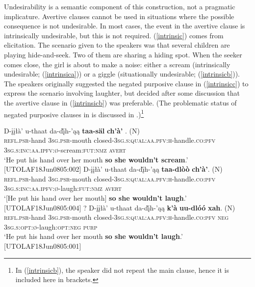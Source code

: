 \documentclass[output=paper,colorlinks,citecolor=brown]{langscibook}
\begin{document}
Undesirability is a semantic component of this construction, not a pragmatic implicature. Avertive clauses cannot be used in situations where the possible consequence is not undesirable. In most cases, the event in the avertive clause is intrinsically undesirable, but this is not required. (\ref{intrinsic}) comes from elicitation. The scenario given to the speakers was that several children are playing hide-and-seek. Two of them are sharing a hiding spot. When the seeker comes close, the girl is about to make a noise: either a scream (intrinsically undesirable; (\ref{intrinsica})) or a giggle (situationally undesirable; (\ref{intrinsicb})). The speakers originally suggested the negated purposive clause in (\ref{intrinsicc}) to express the scenario involving laughter, but decided after some discussion that the avertive clause in (\ref{intrinsicb}) was preferable. (The problematic status of negated purposive clauses in  is discussed in .)\footnote{In (\ref{intrinsicb}), the speaker did not repeat the main clause, hence it is included here in brackets.}

\begin{exe}
\ex \label{intrinsic}
\begin{xlista}
\ex \label{intrinsica}
\gll D-įįłà' u-thaat da-dį̀h-'ąą \textbf{taa-säl} {\textbf{ch'à'} . \textnormal{(N)}} \\
\textsc{refl.psr}-hand \textsc{3sg.psr}-mouth closed-\textsc{3sg.s:qual:aa.pfv:h}-handle.\textsc{co:pfv} \textsc{3sg.s:inc:aa.ipfv:ø}-scream:\textsc{fut:nmz} \textsc{avert} \\
\glt `He put his hand over her mouth \textbf{so she wouldn't scream}.' \\ \hfill [UTOLAF18Jun0805:002]
\ex \label{intrinsicb}
\gll {\ob}D-įįłà' u-thaat da-dį̀h-'ąą{\cb} \textbf{taa-dlòò} {\textbf{ch'à'}. \textnormal{(N)}}\\
\textsc{refl.psr}-hand \textsc{3sg.psr}-mouth closed-\textsc{3sg.s:qual:aa.pfv:h}-handle.\textsc{co:pfv} \textsc{3sg.s:inc:aa.ipfv:ø}-laugh:\textsc{fut:nmz} \textsc{avert} \\
\glt `[He put his hand over her mouth] \textbf{so she wouldn't laugh}.' \\ \hfill [UTOLAF18Jun0805:004]
\ex \label{intrinsicc}
\gll ? D-įįłà' u-thaat da-dį̀h-'ąą \textbf{k'à} \textbf{uu-dlóó} {\textbf{xah}. \textnormal{(N)}}\\
{} \textsc{refl.psr}-hand \textsc{3sg.psr}-mouth closed-\textsc{3sg.s:qual:aa.pfv:h}-handle.\textsc{co:pfv} \textsc{neg} \textsc{3sg.s:opt:ø}-laugh:\textsc{opt:neg} \textsc{purp} \\
\glt `He put his hand over her mouth \textbf{so she wouldn't laugh}.' \\ \hfill [UTOLAF18Jun0805:001]
\end{xlista}
\end{exe}
\end{document}
